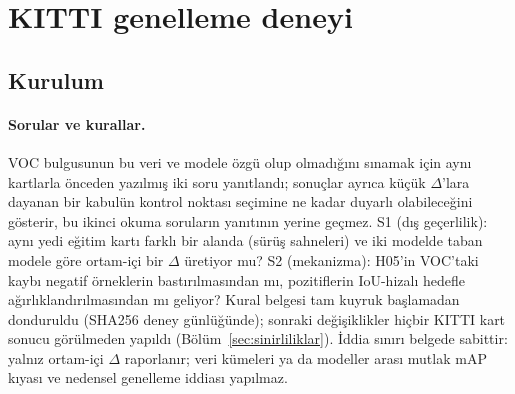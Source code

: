 \documentclass[pdflatex,iicol,sn-mathphys-num]{sn-jnl}
\begin{document}
\section{KITTI genelleme deneyi}\label{sec:genelleme}

\subsection{Kurulum}\label{sec:genelleme-protokol}

\paragraph{Sorular ve kurallar.}
VOC bulgusunun bu veri ve modele özgü olup olmadığını sınamak için aynı kartlarla önceden yazılmış iki soru yanıtlandı; sonuçlar ayrıca küçük $\Delta$'lara dayanan bir kabulün kontrol noktası seçimine ne kadar duyarlı olabileceğini gösterir, bu ikinci okuma soruların yanıtının yerine geçmez. S1 (dış geçerlilik): aynı yedi eğitim kartı farklı bir alanda (sürüş sahneleri) ve iki modelde taban modele göre ortam-içi bir $\Delta$ üretiyor mu? S2 (mekanizma): H05'in VOC'taki kaybı negatif örneklerin bastırılmasından mı, pozitiflerin IoU-hizalı hedefle ağırlıklandırılmasından mı geliyor? Kural belgesi tam kuyruk başlamadan donduruldu (SHA256 deney günlüğünde); sonraki değişiklikler hiçbir KITTI kart sonucu görülmeden yapıldı (Bölüm~\ref{sec:sinirliliklar}). İddia sınırı belgede sabittir: yalnız ortam-içi $\Delta$ raporlanır; veri kümeleri ya da modeller arası mutlak mAP kıyası ve nedensel genelleme iddiası yapılmaz.
\end{document}
